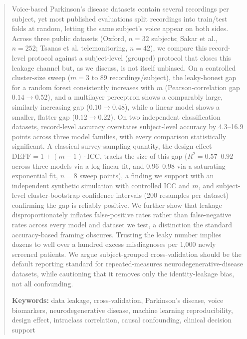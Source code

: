 \documentclass[11pt]{article}
\begin{document}
\begin{abstract}
Voice-based Parkinson's disease datasets contain several recordings per subject, yet most published evaluations split recordings into train/test folds at random, letting the same subject's voice appear on both sides. Across three public datasets (Oxford, $n=32$ subjects; Sakar et al., $n=252$; Tsanas et al. telemonitoring, $n=42$), we compare this record-level protocol against a subject-level (grouped) protocol that closes this leakage channel but, as we discuss, is not itself unbiased. On a controlled cluster-size sweep ($m=3$ to $89$ recordings/subject), the leaky-honest gap for a random forest consistently increases with $m$ (Pearson-correlation gap $0.14 \to 0.52$), and a multilayer perceptron shows a comparably large, similarly increasing gap ($0.10 \to 0.48$), while a linear model shows a smaller, flatter gap ($0.12 \to 0.22$). On two independent classification datasets, record-level accuracy overstates subject-level accuracy by 4.3--16.9 points across three model families, with every comparison statistically significant. A classical survey-sampling quantity, the design effect $\mathrm{DEFF} = 1 + (m-1)\cdot\mathrm{ICC}$, tracks the size of this gap ($R^2 = 0.57$--$0.92$ across three models via a log-linear fit, and $0.96$--$0.98$ via a saturating-exponential fit, $n=8$ sweep points), a finding we support with an independent synthetic simulation with controlled ICC and $m$, and subject-level cluster-bootstrap confidence intervals (200 resamples per dataset) confirming the gap is reliably positive. We further show that leakage disproportionately inflates false-positive rates rather than false-negative rates across every model and dataset we test, a distinction the standard accuracy-based framing obscures. Trusting the leaky number implies dozens to well over a hundred excess misdiagnoses per 1,000 newly screened patients. We argue subject-grouped cross-validation should be the default reporting standard for repeated-measures neurodegenerative-disease datasets, while cautioning that it removes only the identity-leakage bias, not all confounding.

\vspace{1em}
\noindent\textbf{Keywords:} data leakage, cross-validation, Parkinson's disease, voice biomarkers, neurodegenerative disease, machine learning reproducibility, design effect, intraclass correlation, causal confounding, clinical decision support
\end{abstract}
\end{document}
